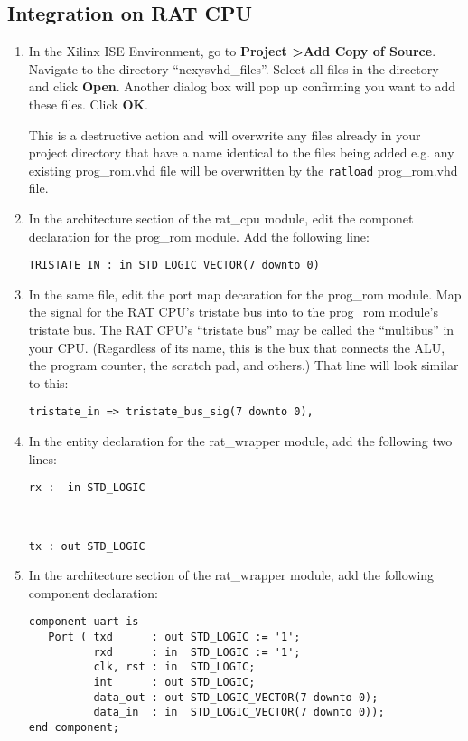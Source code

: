 \documentclass[notitlepage]{article}
\newcommand{\warningsign}{\fontencoding{U}\fontfamily{futs}\Large\selectfont\char 66\relax}
\begin{document}
\subsection{Integration on RAT CPU}
\begin{enumerate}
\item In the Xilinx ISE Environment, go to \textbf{Project \textgreater Add Copy of Source}. Navigate to the directory ``nexys\textunderscore vhd\_files''. Select all files in the directory and click \textbf{Open}. Another dialog box will pop up confirming you want to add these files. Click \textbf{OK}.

\begin{infobox}
  {\warningsign} This is a destructive action and will overwrite any files already in your project directory that have a name identical to the files being added e.g. any existing prog\_rom.vhd file will be overwritten by the \texttt{ratload} prog\_rom.vhd file.
\end{infobox}

\item In the architecture section of the rat\_cpu module, edit the componet declaration for the prog\_rom module. Add the following line:\\
\centerline{\texttt{TRISTATE\_IN : in STD\_LOGIC\_VECTOR(7 downto 0)}}

\item In the same file, edit the port map decaration for the prog\_rom module. Map the signal for the RAT CPU's tristate bus into to the prog\_rom module's tristate bus. The RAT CPU's ``tristate bus'' may be called the ``multibus'' in your CPU. (Regardless of its name, this is the bux that connects the ALU, the program counter, the scratch pad, and others.) That line will look similar to this:\\
\centerline{\texttt{tristate\_in =\textgreater ~tristate\_bus\_sig(7 downto 0),}}

\item In the entity declaration for the rat\_wrapper module, add the following two lines:\\
\centerline{\texttt{rx : ~in STD\_LOGIC}}\\
\centerline{\texttt{tx : out STD\_LOGIC}}

\item In the architecture section of the rat\_wrapper module, add the following component declaration:
\begin{verbatim}
component uart is
   Port ( txd      : out STD_LOGIC := '1';
          rxd      : in  STD_LOGIC := '1';
          clk, rst : in  STD_LOGIC;
          int      : out STD_LOGIC;
          data_out : out STD_LOGIC_VECTOR(7 downto 0);
          data_in  : in  STD_LOGIC_VECTOR(7 downto 0));
end component;
\end{verbatim}


\end{enumerate}
\end{document}
